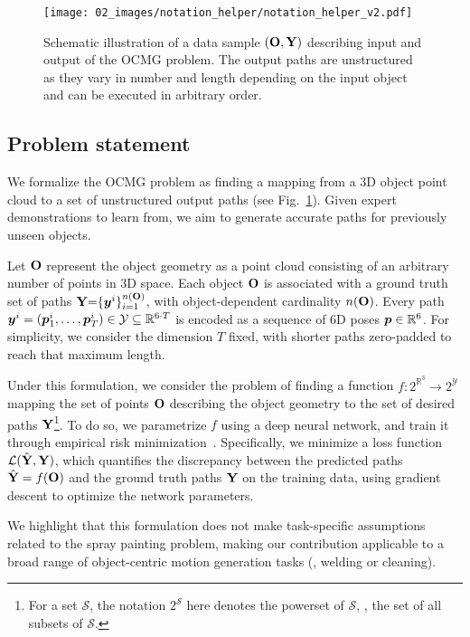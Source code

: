 \begin{figure}[!t]
    \centering
    \texttt{[image: 02\_images/notation\_helper/notation\_helper\_v2.pdf]}
    \vspace{-16pt}
    \caption{Schematic illustration of a data sample $(\mathbf{O}, \mathbf{Y})$ describing input and output of the OCMG problem. The output paths are unstructured as they vary in number and length depending on the input object and can be executed in arbitrary order.}
    \label{fig:notation_helper}
\end{figure}


\subsection{Problem statement}
We formalize the OCMG problem as finding a mapping from a 3D object point cloud to a set of unstructured output paths (see Fig.~\ref{fig:notation_helper}). 
Given expert demonstrations to learn from, we aim to generate accurate paths for previously unseen objects. 

Let $\mathbf{O}$ represent the object geometry as a point cloud consisting of an arbitrary number of points in 3D space.
%
Each object $\mathbf{O}$ is associated with a ground truth set of paths $\mathbf{Y} {=} \{\boldsymbol{y}^i \}_{i=1}^{n(\mathbf{O})}$, with object-dependent cardinality $n(\mathbf{O})$. 
Every path $\boldsymbol{y}^i = (\boldsymbol{p}^i_1, \dots, \boldsymbol{p}^i_T) \in \mathcal{Y} \subseteq \mathbb{R}^{6 \cdot T}$ is encoded as a sequence of 6D poses $\boldsymbol{p} \in \mathbb{R}^6$. For simplicity, we consider the dimension $T$ fixed, with shorter paths zero-padded to reach that maximum length.  

Under this formulation, we consider the problem of finding a function $f : 2^{\mathbb{R}^{3}} \rightarrow 2^{\mathcal{Y}}$ mapping the set of points $\mathbf{O}$ describing the object geometry to the set of desired paths $\mathbf{Y}$\footnote{For a set \( \mathcal{S} \), the notation \( 2^{\mathcal{S}} \) here denotes the powerset of \( \mathcal{S} \), \ie, the set of all subsets of \( \mathcal{S} \).}.
To do so, we parametrize $f$ using a deep neural network, and train it through empirical risk minimization~\cite{vapnik1991principleserm}.
%
Specifically, we minimize a loss function $\mathcal{L}(\hat{\mathbf{Y}}, \mathbf{Y})$, which quantifies the discrepancy between the predicted paths $\hat{\mathbf{Y}}=f(\mathbf{O})$ and the ground truth paths $\mathbf{Y}$ on the training data, using gradient descent to optimize the network parameters.

%
We highlight that this formulation does not make task-specific assumptions related to the spray painting problem, making our contribution applicable to a broad range of object-centric motion generation tasks (\eg, welding or cleaning).
%
%

